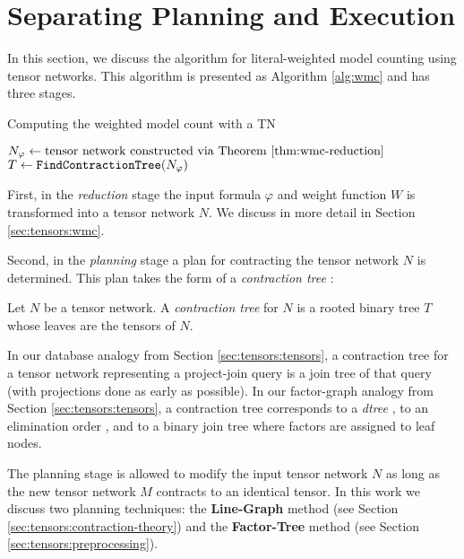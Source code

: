 \section{Separating Planning and Execution}
\label{sec:algorithm}
In this section, we discuss the algorithm for literal-weighted model counting using tensor networks. This algorithm is presented as Algorithm \ref{alg:wmc} and has three stages.

\begin{algorithm*}[t]
    \label{alg:wmc}
    \caption{Computing the weighted model count with a TN}
    \DontPrintSemicolon
    $N_\varphi \gets \text{tensor network constructed via Theorem \ref{thm:wmc-reduction}}$\;
    $T \gets \texttt{\upshape FindContractionTree}(N_\varphi)$ 
\end{algorithm*}

First, in the \emph{reduction} stage the input formula $\varphi$ and weight function $W$ is transformed into a tensor network $N$. We discuss in more detail in Section \ref{sec:tensors:wmc}.

Second, in the \emph{planning} stage a plan for contracting the tensor network $N$ is determined. This plan takes the form of a \emph{contraction tree} \cite{EP14}:
\begin{definition} \label{def:contraction-tree}
	Let $N$ be a tensor network. A \emph{contraction tree} for $N$ is a rooted binary tree $T$ whose leaves are the tensors of $N$. %
\end{definition}

In our database analogy from Section \ref{sec:tensors:tensors}, a contraction tree for a tensor network representing a project-join query is a join tree of that query (with projections done as early as possible). 
In our factor-graph analogy from Section \ref{sec:tensors:tensors}, a contraction tree corresponds to a \emph{dtree} \cite{darwiche01}, to an elimination order \cite{darwiche01b}, and to a binary join tree \cite{shenoy97} where factors are assigned to leaf nodes.

The planning stage is allowed to modify the input tensor network $N$ as long as the new tensor network $M$ contracts to an identical tensor. In this work we discuss two planning techniques: the \textbf{Line-Graph} method (see Section \ref{sec:tensors:contraction-theory}) and the \textbf{Factor-Tree} method (see Section \ref{sec:tensors:preprocessing}). 

